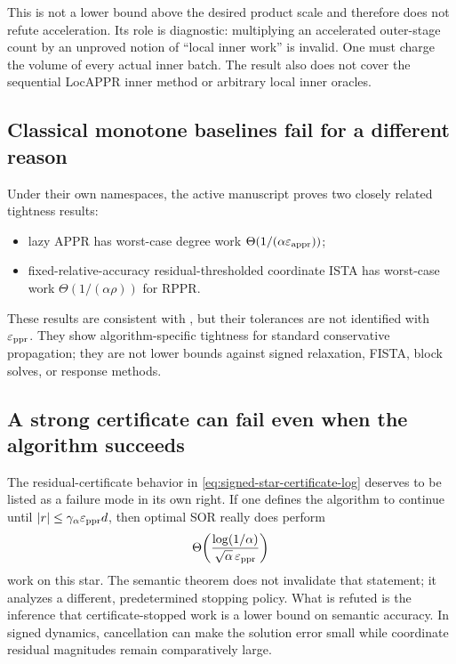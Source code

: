 This is not a lower bound above the desired product scale and therefore does
not refute acceleration.  Its role is diagnostic: multiplying an accelerated
outer-stage count by an unproved notion of ``local inner work'' is invalid.
One must charge the volume of every actual inner batch.  The result also does
not cover the sequential LocAPPR inner method or arbitrary local inner
oracles.

\subsection{Classical monotone baselines fail for a different reason}

Under their own namespaces, the active manuscript proves two closely related
tightness results:
\begin{itemize}[leftmargin=*]
\item lazy APPR has worst-case degree work
      $\Theta(1/(\alpha\varepsilon_{\rm appr}))$;
\item fixed-relative-accuracy residual-thresholded coordinate ISTA has
      worst-case work $\Theta(1/(\alpha\rho))$ for RPPR.
\end{itemize}
These results are consistent with
, but their tolerances are not identified
with $\varepsilon_{\rm ppr}$.  They show algorithm-specific tightness for
standard conservative propagation; they are not lower bounds against signed
relaxation, FISTA, block solves, or response methods.

\subsection{A strong certificate can fail even when the algorithm succeeds}

The residual-certificate behavior in
\eqref{eq:signed-star-certificate-log} deserves to be listed as a failure mode
in its own right.  If one defines the algorithm to continue until
$|r|\le\gamma_\alpha\varepsilon_{\rm ppr}d$, then optimal SOR really does
perform
\begin{equation}
  \Theta\!\left(
    \frac{\log(1/\alpha)}
         {\sqrt\alpha\,\varepsilon_{\rm ppr}}
  \right)
  \label{eq:signed-star-certificate-work}
\end{equation}
work on this star.  The semantic theorem does not invalidate that statement;
it analyzes a different, predetermined stopping policy.  What is refuted is
the inference that certificate-stopped work is a lower bound on semantic
accuracy.  In signed dynamics, cancellation can make the solution error small
while coordinate residual magnitudes remain comparatively large.

